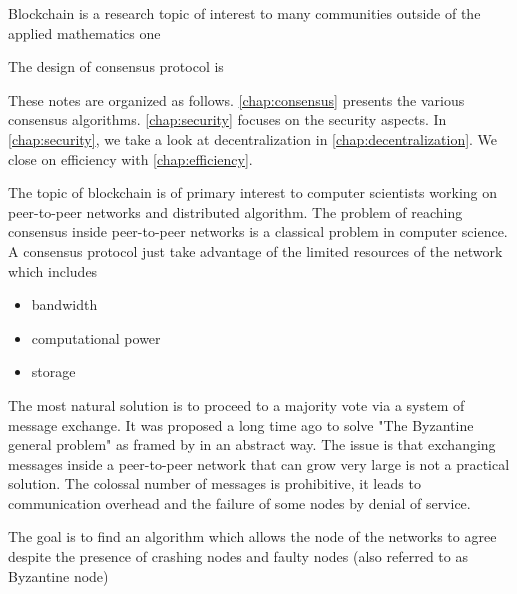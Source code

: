 Blockchain is a research topic of interest to many communities outside of the applied mathematics one

The design of consensus protocol is      

These notes are organized as follows. \cref{chap:consensus} presents the various consensus algorithms. \cref{chap:security} focuses on the security aspects. In \cref{chap:security}, we take a look at decentralization in \cref{chap:decentralization}. We close on efficiency with \cref{chap:efficiency}.



The topic of blockchain is of primary interest to computer scientists working on peer-to-peer networks and distributed algorithm. The problem of reaching consensus inside peer-to-peer networks is a classical problem in computer science. A consensus protocol just take advantage of the limited resources of the network which includes
\begin{itemize} 
	\item bandwidth
	\item computational power
	\item storage
\end{itemize}
The most natural solution is to proceed to a majority vote via a system of message exchange. It was proposed a long time ago to solve "The Byzantine general problem" as framed by \citet{lamport1982the} in an abstract way. The issue is that exchanging messages inside a peer-to-peer network that can grow very large is not a practical solution. The colossal number of messages is prohibitive, it leads to communication overhead and the failure of some nodes by denial of service.   

The goal is to find an algorithm which allows the node of the networks to agree despite the presence of crashing nodes and faulty nodes (also referred to as Byzantine node)

